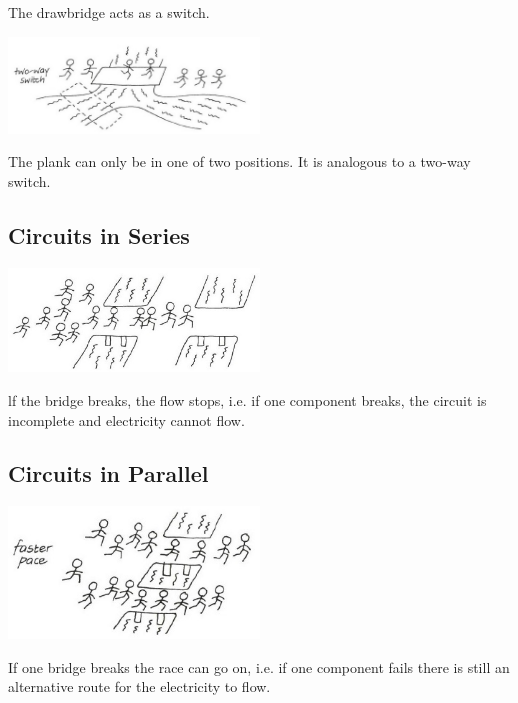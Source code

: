 \begin{multicols}{2}
The drawbridge acts as a switch.

\begin{center}
\includegraphics[width=0.5\textwidth]{./img/vso/analogy-switch-2.jpg}
\end{center}

The plank can only be in one of
two positions. It is analogous to a
two-way switch.


\subsection*{Circuits in Series}

\begin{center}
\includegraphics[width=0.5\textwidth]{./img/vso/analogy-series.jpg}
\end{center}

lf the bridge breaks, the flow stops, i.e. if one component breaks, the
circuit is incomplete and electricity cannot flow.

\vfill
\columnbreak

\subsection*{Circuits in Parallel}

\begin{center}
\includegraphics[width=0.5\textwidth]{./img/vso/analogy-parallel.jpg}
\end{center}

If one bridge breaks the race can go on, i.e. if one component fails
there is still an alternative route for the electricity to flow.


\end{multicols}

